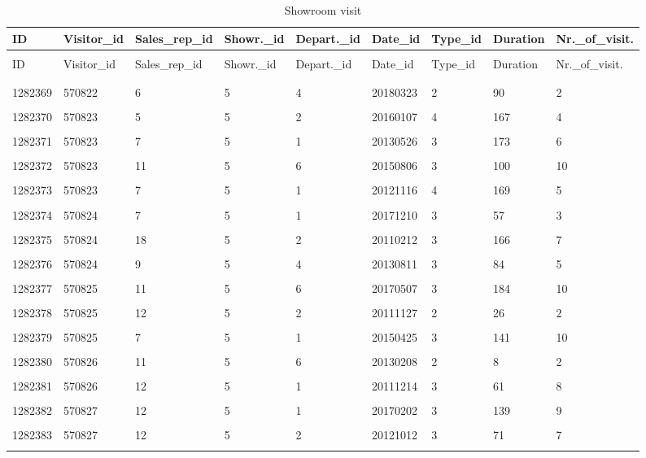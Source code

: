 \documentclass[letterpaper,12pt]{article}
\begin{document}
\begin{longtable}{p{1.4cm}p{1.5cm}p{1.8cm}p{1.5cm}p{1.6cm}p{1.4cm}p{1.2cm}p{1.25cm}p{1.85cm}}
        \caption{Showroom visit} \\
        ID & Visitor\_id & Sales\_rep\_id & Showr.\_id & Depart.\_id & Date\_id & Type\_id & Duration & Nr.\_of\_visit. \\
        \endfirsthead \\
        ID & Visitor\_id & Sales\_rep\_id & Showr.\_id & Depart.\_id & Date\_id & Type\_id & Duration & Nr.\_of\_visit. \\
        \endhead \\
        \hline \\
        1282369	& \color{red} 570822 & 6 & \color{red} 5 & 4 & \color{red}20180323 & 2 & 90 & 2 \\
        \hline \\
        1282370	& 570823 & 5 & 5 & 2 & 20160107 & 4 & 167 & 4 \\
        \hline \\
        1282371	& 570823 & 7 & 5 & 1 & 20130526 & 3 & 173 & 6 \\
        \hline \\
        1282372	& 570823 & 11 & 5 & 6 & 20150806  & 3 & 100 & 10 \\
        \hline \\
        1282373	& 570823 & 7 & 5 & 1 & 20121116 & 4 & 169 & 5 \\
        \hline \\
        1282374	& 570824 & 7 & 5 & 1 & 20171210 & 3 & 57 & 3 \\
        \hline \\
        1282375	& 570824 & 18 & 5 & 2 & 20110212 & 3 & 166 & 7 \\
        \hline \\
        1282376	& 570824 & 9 & 5 & 4 & 20130811  & 3 & 84 & 5 \\
        \hline \\
        1282377	& 570825 & 11 & 5 & 6 & 20170507 & 3 & 184 & 10 \\
        \hline \\
        1282378	& 570825 & 12 & 5 & 2 & 20111127 & 2 & 26 & 2 \\
        \hline \\
        1282379	& 570825 & 7 & 5 & 1 & 20150425 & 3 & 141 & 10 \\
        \hline \\
        1282380	& 570826 & 11 & 5 & 6 & 20130208 & 2 & 8 & 2 \\
        \hline \\
        1282381	& 570826 & 12 & 5 & 1 & 20111214 & 3 & 61 & 8 \\
        \hline \\
        1282382	& 570827 & 12 & 5 & 1 & 20170202 & 3 & 139 & 9 \\
        \hline \\
        1282383 & 570827 & 12 & 5 & 2 & 20121012 & 3 & 71 & 7 \\
        \hline \\
\end{longtable}
\end{document}
